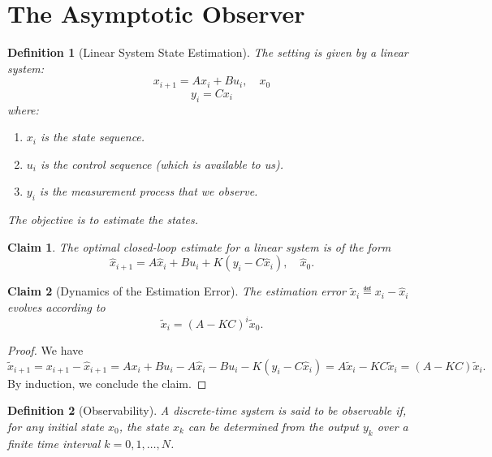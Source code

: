 \documentclass[a4 paper]{article}
\numberwithin{equation}{section}
\theoremstyle{boldStyle}
\theoremstyle{boldBlueStyle}
\newtheorem{claim}{Claim}[section]
\theoremstyle{boldPurpleStyle}
\theoremstyle{boldRedStyle}
\newtheorem{definition}{Definition}[section]
\theoremstyle{boldGreenStyle}
\begin{document}
\section{The Asymptotic Observer}

\begin{definition}[Linear System State Estimation]
  The setting is given by a linear system:
  \[
  x_{i+1} = A x_i + B u_i, \quad x_0
  \]
  \[
  y_i = C x_i
  \]
  where:
  \begin{enumerate}
      \item \( x_i \) is the state sequence.
      \item \( u_i \) is the control sequence (which is available to us).
      \item \( y_i \) is the measurement process that we observe.
  \end{enumerate}
  
  The objective is to estimate the states. 
\end{definition}

\begin{claim}
  The optimal closed-loop estimate for a linear system is of the form 
  \[
    \hat{x}_{i+1} = A \hat{x}_i + B u_i + K(y_i - C \hat{x}_i), \quad \hat{x}_0.
  \] 
\end{claim}

\begin{claim}[Dynamics of the Estimation Error]
  The estimation error \( \tilde{x}_{i} \eqdef x_{i} - \hat{x}_{i} \) evolves according to
  \[
  \tilde{x}_{i} = (A - KC)^{i} \tilde{x}_0.
  \]
\end{claim}

\begin{proof}
  We have
  \[
  \tilde{x}_{i+1} = x_{i+1} - \hat{x}_{i+1} = A x_i + B u_i - A \hat{x}_i - B u_i - K(y_i - C \hat{x}_i) = A \tilde{x}_i - K C \tilde{x}_i = (A - KC) \tilde{x}_i.
  \]
  By induction, we conclude the claim.
\end{proof}


\begin{definition}[Observability]
  A discrete-time system is said to be observable if, for any initial state \( x_0 \), the state \( x_k \) can be determined from the output \( y_k \) over a finite time interval \( k = 0, 1, \ldots, N \).
  \end{definition}
  
\end{document}
